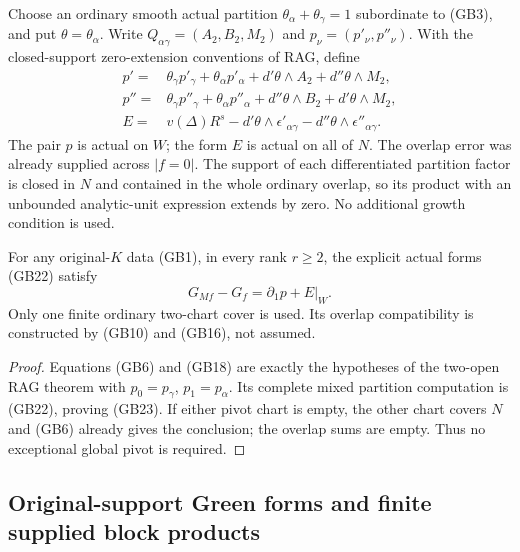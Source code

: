Choose an ordinary smooth actual partition
$\theta_\alpha+\theta_\gamma=1$ subordinate to (GB3), and put
$\theta=\theta_\alpha$.  Write
$Q_{\alpha\gamma}=(A_2,B_2,M_2)$ and
$p_\nu=(p'_\nu,p''_\nu)$.  With the closed-support zero-extension
conventions of RAG, define
\[
 \begin{split}
 p'={}&\theta_\gamma p'_\gamma+\theta_\alpha p'_\alpha
                         +d'\theta\wedge A_2+d''\theta\wedge M_2,\\
 p''={}&\theta_\gamma p''_\gamma+\theta_\alpha p''_\alpha
                         +d''\theta\wedge B_2+d'\theta\wedge M_2,\\
 E={}&v(\Delta)R^s
              -d'\theta\wedge\epsilon'_{\alpha\gamma}
              -d''\theta\wedge\epsilon''_{\alpha\gamma}.
 \end{split}
 \tag{GB22}
\]
The pair $p$ is actual on $W$; the form $E$ is actual on all
of $N$.  The overlap error was already supplied across $|f=0|$.
The support of each differentiated partition factor is closed
in $N$ and contained in the whole ordinary overlap, so its
product with an unbounded analytic-unit expression extends
by zero.  No additional growth condition is used.

\begin{theorem}
For any original-$K$ data (GB1), in every rank $r\ge2$, the
explicit actual forms (GB22) satisfy
\[
                      G_{Mf}-G_f=\partial_1p+E|_W.
 \tag{GB23}
\]
Only one finite ordinary two-chart cover is used.  Its overlap
compatibility is constructed by (GB10) and (GB16), not assumed.
\end{theorem}

\begin{proof}
Equations (GB6) and (GB18) are exactly the hypotheses of the
two-open RAG theorem with $p_0=p_\gamma$, $p_1=p_\alpha$.
Its complete mixed partition computation is (GB22), proving
(GB23).  If either pivot chart is empty, the other chart covers
$N$ and (GB6) already gives the conclusion; the overlap sums
are empty.  Thus no exceptional global pivot is required.
\end{proof}

\subsection{Original-support Green forms and finite supplied block products}

